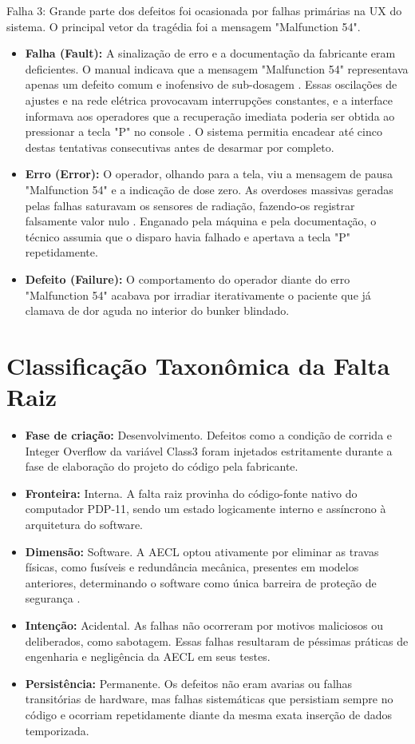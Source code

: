 \documentclass[12pt,a4paper]{article}
\begin{document}
Falha 3:
Grande parte dos defeitos foi ocasionada por falhas primárias na UX do sistema. O principal vetor da tragédia foi a mensagem "Malfunction 54".

\begin{itemize}
    \item \textbf{Falha (Fault):} A sinalização de erro e a documentação da fabricante eram deficientes. O manual indicava que a mensagem "Malfunction 54" representava apenas um defeito comum e inofensivo de sub-dosagem \cite{vastblue_what_happened}. Essas oscilações de ajustes e na rede elétrica provocavam interrupções constantes, e a interface informava aos operadores que a recuperação imediata poderia ser obtida ao pressionar a tecla "P" no console \cite{smartbear_race}. O sistema permitia encadear até cinco destas tentativas consecutivas antes de desarmar por completo.
    \item \textbf{Erro (Error):} O operador, olhando para a tela, viu a mensagem de pausa "Malfunction 54" e a indicação de dose zero. As overdoses massivas geradas pelas falhas saturavam os sensores de radiação, fazendo-os registrar falsamente valor nulo \cite{vastblue_what_happened}. Enganado pela máquina e pela documentação, o técnico assumia que o disparo havia falhado e apertava a tecla "P" repetidamente.
    \item \textbf{Defeito (Failure):} O comportamento do operador diante do erro "Malfunction 54" acabava por irradiar iterativamente o paciente que já clamava de dor aguda no interior do bunker blindado.
\end{itemize}


\section*{Classificação Taxonômica da Falta Raiz}
\begin{itemize}
    \item \textbf{Fase de criação:} Desenvolvimento. Defeitos como a condição de corrida e Integer Overflow da variável Class3 foram injetados estritamente durante a fase de elaboração do projeto do código pela fabricante.  
    \item \textbf{Fronteira:} Interna. A falta raiz provinha do código-fonte nativo do computador PDP-11, sendo um estado logicamente interno e assíncrono à arquitetura do software.
    \item \textbf{Dimensão:} Software. A AECL optou ativamente por eliminar as travas físicas, como fusíveis e redundância mecânica, presentes em modelos anteriores, determinando o software como única barreira de proteção de segurança \cite{vastblue_what_happened}.  
    \item \textbf{Intenção:} Acidental. As falhas não ocorreram por motivos maliciosos ou deliberados, como sabotagem. Essas falhas resultaram de péssimas práticas de engenharia e negligência da AECL em seus testes.
    \item \textbf{Persistência:} Permanente. Os defeitos não eram avarias ou falhas transitórias de hardware, mas falhas sistemáticas que persistiam sempre no código e ocorriam repetidamente diante da mesma exata inserção de dados temporizada.
\end{itemize}
\end{document}
